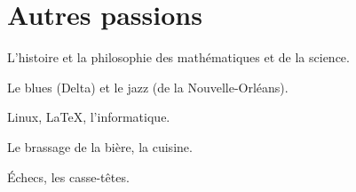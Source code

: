 \documentclass[11pt,a4paper,twoside,french]{article}
\begin{document}
\section*{Autres passions}

\begin{list}{}{\leftmargin=0pt}
  \item L'histoire et la philosophie des mathématiques et de la science.
  \item Le blues (Delta) et le jazz (de la Nouvelle-Orléans).
  \item Linux, \LaTeX{}, l'informatique.
  \item Le brassage de la bière, la cuisine.
  \item Échecs, les casse-têtes.
\end{list}
\end{document}
